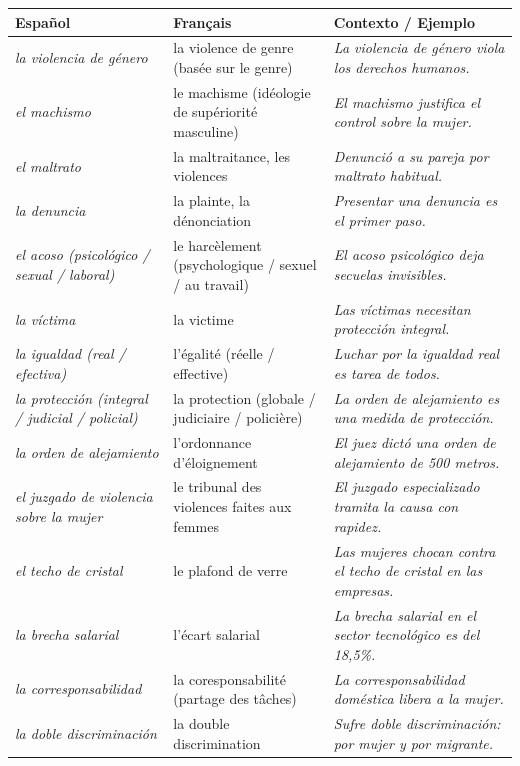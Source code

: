\documentclass[11pt]{article}
\newcommand{\esp}[1]{\ifmmode\text{\textit{#1}}\else\begingroup\selectlanguage{spanish}\itshape #1\endgroup\fi}
\begin{document}
\begin{definition}
\begin{center}
\begin{tabularx}{\linewidth}{|X|X|X|}
\hline
\rowcolor{popblueL} \textbf{Español} & \textbf{Français} & \textbf{Contexto / Ejemplo} \\
\hline
\emph{la violencia de género} & la violence de genre (basée sur le genre) & \esp{La violencia de género viola los derechos humanos.} \\
\hline
\emph{el machismo} & le machisme (idéologie de supériorité masculine) & \esp{El machismo justifica el control sobre la mujer.} \\
\hline
\emph{el maltrato} & la maltraitance, les violences & \esp{Denunció a su pareja por maltrato habitual.} \\
\hline
\emph{la denuncia} & la plainte, la dénonciation & \esp{Presentar una denuncia es el primer paso.} \\
\hline
\emph{el acoso (psicológico / sexual / laboral)} & le harcèlement (psychologique / sexuel / au travail) & \esp{El acoso psicológico deja secuelas invisibles.} \\
\hline
\emph{la víctima} & la victime & \esp{Las víctimas necesitan protección integral.} \\
\hline
\emph{la igualdad (real / efectiva)} & l'égalité (réelle / effective) & \esp{Luchar por la igualdad real es tarea de todos.} \\
\hline
\emph{la protección (integral / judicial / policial)} & la protection (globale / judiciaire / policière) & \esp{La orden de alejamiento es una medida de protección.} \\
\hline
\emph{la orden de alejamiento} & l'ordonnance d'éloignement & \esp{El juez dictó una orden de alejamiento de 500 metros.} \\
\hline
\emph{el juzgado de violencia sobre la mujer} & le tribunal des violences faites aux femmes & \esp{El juzgado especializado tramita la causa con rapidez.} \\
\hline
\emph{el techo de cristal} & le plafond de verre & \esp{Las mujeres chocan contra el techo de cristal en las empresas.} \\
\hline
\emph{la brecha salarial} & l'écart salarial & \esp{La brecha salarial en el sector tecnológico es del 18,5\%.} \\
\hline
\emph{la corresponsabilidad} & la coresponsabilité (partage des tâches) & \esp{La corresponsabilidad doméstica libera a la mujer.} \\
\hline
\emph{la doble discriminación} & la double discrimination & \esp{Sufre doble discriminación: por mujer y por migrante.} \\
\hline
\end{tabularx}
\end{center}
\end{definition}
\end{document}
